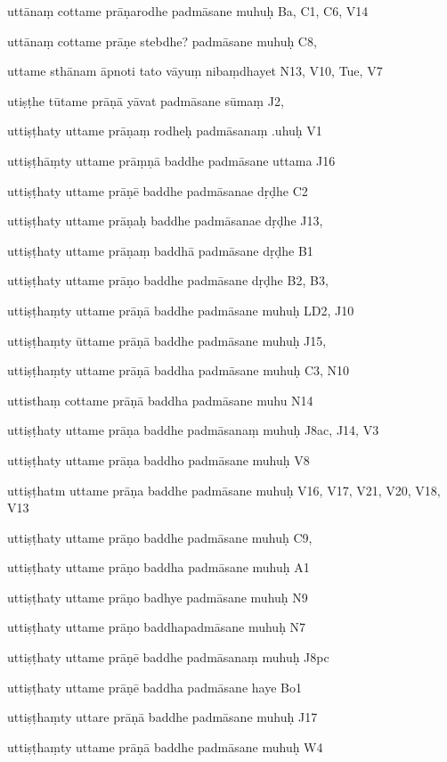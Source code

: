 \begin{ekdosis}
\begin{marma}[hp01_055]
\begin{marma}[hp02_009]
\begin{marma}[hp02_011]
\begin{marma}[hp02_012]
\item[uttānaṃ cottame prāṇarodhe padmāsane muhuḥ] Ba, C1, C6, V14
\item[uttānaṃ cottame prāṇe stebdhe? padmāsane muhuḥ] C8,
\item[uttame sthānam āpnoti tato vāyuṃ nibaṃdhayet] N13, V10, Tue, V7
\item[utiṣṭhe tūtame prāṇā yāvat padmāsane sūmaṃ] J2,
\item[uttiṣṭhaty uttame prāṇaṃ rodheḥ padmāsanaṃ .uhuḥ] V1
\item[uttiṣṭhāṃty uttame prāṃṇā baddhe padmāsane uttama] J16
\item[uttiṣṭhaty uttame prāṇē baddhe padmāsanae dṛḍhe] C2
\item[uttiṣṭhaty uttame prāṇaḥ baddhe padmāsanae dṛḍhe] J13,
\item[uttiṣṭhaty uttame prāṇaṃ baddhā padmāsane dṛḍhe] B1
\item[uttiṣṭhaty uttame prāṇo baddhe padmāsane dṛḍhe] B2, B3,
\item[uttiṣṭhaṃty uttame prāṇā baddhe padmāsane muhuḥ] LD2, J10
\item[uttiṣṭhaṃty ūttame prāṇā baddhe padmāsane muhuḥ] J15,
\item[uttiṣṭhaṃty uttame prāṇā baddha padmāsane muhuḥ] C3, N10
\item[uttisthaṃ cottame prāṇā baddha padmāsane muhu] N14
\item[uttiṣṭhaty uttame prāṇa baddhe padmāsanaṃ muhuḥ] J8ac, J14, V3
\item[uttiṣṭhaty uttame prāṇa baddho padmāsane muhuḥ] V8
\item[uttiṣṭhatm uttame prāṇa baddhe padmāsane muhuḥ] V16, V17, V21, V20, V18, V13
\item[uttiṣṭhaty uttame prāṇo baddhe padmāsane muhuḥ] C9, 
\item[uttiṣṭhaty uttame prāṇo baddha padmāsane muhuḥ] A1
\item[uttiṣṭhaty uttame prāṇo badhye padmāsane muhuḥ] N9
\item[uttiṣṭhaty uttame prāṇo baddhapadmāsane muhuḥ] N7
\item[uttiṣṭhaty uttame prāṇē baddhe padmāsanaṃ muhuḥ] J8pc
\item[uttiṣṭhaty uttame prāṇē baddha padmāsane haye] Bo1
\item[uttiṣṭhaṃty uttare prāṇā baddhe padmāsane muhuḥ] J17
\item[uttiṣṭhaṃty uttame prāṇā baddhe padmāsane muhuḥ] W4

\end{marma}
\end{marma}
\end{marma}
\end{marma}
\end{ekdosis}
